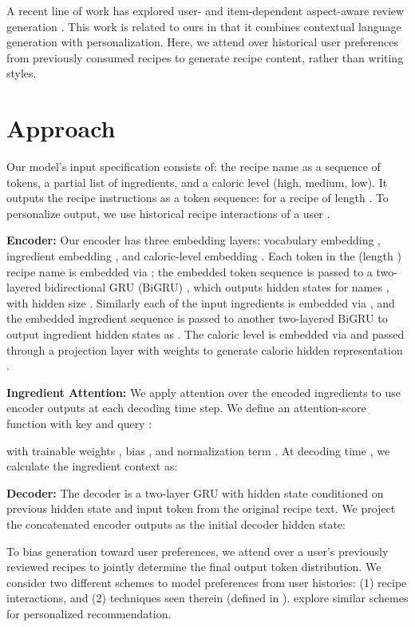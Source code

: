 \documentclass[11pt,a4paper]{article}
\begin{document}
A recent line of work has explored user- and item-dependent aspect-aware review generation \cite{DBLP:conf/ijcnlp/NiLVM17,DBLP:conf/acl/NiM18}.
This work is related to ours in that it combines contextual language generation with personalization.
Here, we attend over historical user preferences from previously consumed recipes to generate recipe content, rather than writing styles.

\section{Approach}
Our model's input specification consists of: the recipe name as a sequence of tokens, a partial list of ingredients, and a caloric level (high, medium, low).
It outputs the recipe instructions as a token sequence:  for a recipe  of length .
To personalize output, we use historical recipe interactions of a user .

\noindent
\textbf{Encoder:}
Our encoder has three embedding layers: vocabulary embedding , ingredient embedding , and caloric-level embedding .
Each token in the (length ) recipe name is embedded via ; the embedded token sequence is passed to a two-layered bidirectional GRU (BiGRU) \cite{DBLP:conf/emnlp/ChoMGBBSB14}, which outputs hidden states for names , with hidden size .
Similarly each of the  input ingredients is embedded via , and the embedded ingredient sequence is passed to another two-layered BiGRU to output ingredient hidden states as .
The caloric level is embedded via  and passed through a projection layer with  weights  to generate calorie hidden representation .

\noindent
\textbf{Ingredient Attention:}
We apply attention \cite{bahdanau2014neural} over the encoded ingredients to use encoder outputs at each decoding time step.
We define an attention-score function  with key  and query : 

with trainable weights , bias , and normalization term .
At decoding time , we calculate the ingredient context  as:


\noindent
\textbf{Decoder:}
The decoder is a two-layer GRU with hidden state  conditioned on previous hidden state  and input token  from the original recipe text. 
We project the concatenated encoder outputs as the initial decoder hidden state:


To bias  generation toward user preferences, we attend over a user's previously reviewed recipes to jointly determine the final output token distribution.
We consider two different schemes to model preferences from user histories: (1) recipe interactions, and (2) techniques seen therein (defined in ).
\citet{DBLP:conf/uai/RendleFGS09, DBLP:conf/um/QuadranaCJ18, Ueda:2011:UFP:2887675.2887686} explore similar schemes for personalized recommendation.
\end{document}
